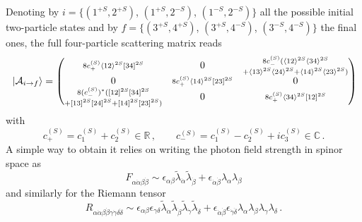 Denoting by $i=\{(1^{+S},2^{+S})$, $ (1^{+S},2^{-S})$, $ (1^{-S},2^{-S})\}$ all the possible initial two-particle states and by $f=\{(3^{+S},4^{+S})$, $ (3^{+S},4^{-S})$, $(3^{-S},4^{-S})\}$ the final ones, the full four-particle scattering matrix reads
%
\begin{equation}\label{eq:amplitude}
    \ket*{\mathcal A_{i\to f}} = 
    \begin{pmatrix}
        \substack{8c_+^{(S)}\langle 1 2 \rangle^{2S}\lbrack 3 4 \rbrack^{2S}} & 0 
        & \substack{8c_-^{(S)}(\langle 1 2 \rangle^{2S}\langle 3 4 \rangle^{2S}\\+\langle 1 3 \rangle^{2S}\langle 2 4 \rangle^{2S}+\langle 1 4 \rangle^{2S}\langle 2 3 \rangle^{2S})}
        \\
        0 & \substack{8c_+^{(S)}\langle 1 4 \rangle^{2S}\lbrack 2 3 \rbrack^{2S}} 
        & 0
        \\
        \substack{8(c_-^{(S)})^*(\lbrack 1 2 \rbrack^{2S}\lbrack 3 4 \rbrack^{2S}\\+\lbrack 1 3 \rbrack^{2S}\lbrack 2 4 \rbrack^{2S}+\lbrack 1 4 \rbrack^{2S}\lbrack 2 3 \rbrack^{2S})} & 0 
        & \substack{8c_+^{(S)}\langle 3 4 \rangle^{2S}\lbrack 1 2 \rbrack^{2S}}
    \end{pmatrix}
\end{equation}
%
with 
\begin{equation}
    c_+^{(S)}= c_1^{(S)} + c_2^{(S)}\in \mathbb{R} \,, \qquad
    c_-^{(S)}= c_1^{(S)} - c_2^{(S)} + i c_3^{(S)}\in \mathbb{C}\,.
\end{equation}
%
A simple way to obtain it relies on writing the photon field strength in spinor space as 
\begin{equation}
    F_{\alpha \dot \alpha \beta \dot \beta} \sim \epsilon_{\alpha\beta}\widetilde\lambda_{\dot \alpha}\widetilde\lambda_{\dot \beta}+\epsilon_{\dot\alpha\dot\beta}\lambda_\alpha \lambda_\beta
\end{equation}
and similarly for the Riemann tensor \cite{Arkani-Hamed:2020blm}
\begin{equation}
    R_{\alpha\dot\alpha\beta\dot\beta\gamma\dot\gamma\delta\dot\delta}\sim \epsilon_{\alpha\beta}\epsilon_{\gamma\delta}\widetilde\lambda_{\dot\alpha}\widetilde\lambda_{\dot\beta}\widetilde\lambda_{\dot\gamma}\widetilde\lambda_{\dot\delta} + \epsilon_{\dot\alpha\dot\beta}\epsilon_{\dot\gamma\dot\delta}\lambda_{\alpha}\lambda_{\beta}\lambda_{\gamma}\lambda_{\delta}\,.
\end{equation}

